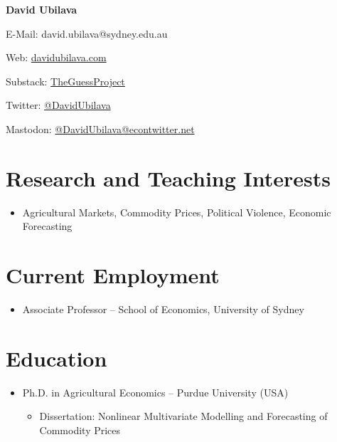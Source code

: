 \documentclass[10pt]{article}
\begin{document}
	
	
	
	\hspace{0.00in}\Large{\bfseries{David Ubilava}}
	\normalsize
	
	\medskip
	
	{E-Mail: david.ubilava@sydney.edu.au}
	
	\smallskip
	
	{Web: \href{https://davidubilava.com}{davidubilava.com}}
	
	\smallskip
	
	{Substack: \href{https://theguessproject.substack.com}{TheGuessProject}}
	
	\smallskip
	
	{Twitter: \href{https://twitter.com/DavidUbilava}{@DavidUbilava}}
	
	\smallskip
	
	{Mastodon: \href{https://econtwitter.net/@DavidUbilava}{@DavidUbilava@econtwitter.net}}
	
	\medskip

	
	\section*{Research and Teaching Interests}
	\begin{itemize}
		\item Agricultural Markets, Commodity Prices, Political Violence, Economic Forecasting
	\end{itemize}
	
	\section*{Current Employment}
	\begin{itemize}
		\item {} Associate Professor -- School of Economics, University of Sydney
	\end{itemize}
	
	\section*{Education}
	\begin{itemize}
		\item {} Ph.D. in Agricultural Economics -- Purdue University (USA)
		\begin{itemize}
			\item Dissertation: Nonlinear Multivariate Modelling and Forecasting of Commodity Prices
		\end{itemize}
	\end{itemize}
	
\end{document}
